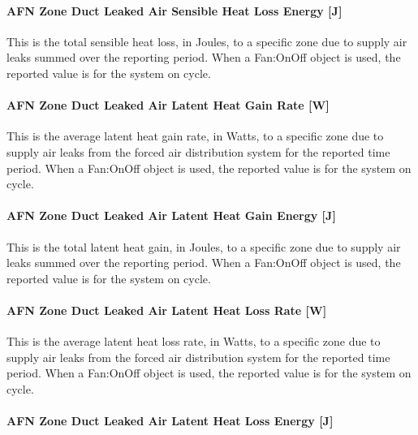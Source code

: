\paragraph{AFN Zone Duct Leaked Air Sensible Heat Loss Energy {[}J{]}}\label{afn-zone-duct-leaked-air-sensible-heat-loss-energy-j}

This is the total sensible heat loss, in Joules, to a specific zone due to supply air leaks summed over the reporting period. When a Fan:OnOff object is used, the reported value is for the system on cycle.

\paragraph{AFN Zone Duct Leaked Air Latent Heat Gain Rate {[}W{]}}\label{afn-zone-duct-leaked-air-latent-heat-gain-rate-w}

This is the average latent heat gain rate, in Watts, to a specific zone due to supply air leaks from the forced air distribution system for the reported time period. When a Fan:OnOff object is used, the reported value is for the system on cycle.

\paragraph{AFN Zone Duct Leaked Air Latent Heat Gain Energy {[}J{]}}\label{afn-zone-duct-leaked-air-latent-heat-gain-energy-j}

This is the total latent heat gain, in Joules, to a specific zone due to supply air leaks summed over the reporting period. When a Fan:OnOff object is used, the reported value is for the system on cycle.

\paragraph{AFN Zone Duct Leaked Air Latent Heat Loss Rate {[}W{]}}\label{afn-zone-duct-leaked-air-latent-heat-loss-rate-w}

This is the average latent heat loss rate, in Watts, to a specific zone due to supply air leaks from the forced air distribution system for the reported time period. When a Fan:OnOff object is used, the reported value is for the system on cycle.

\paragraph{AFN Zone Duct Leaked Air Latent Heat Loss Energy {[}J{]}}\label{afn-zone-duct-leaked-air-latent-heat-loss-energy-j}

